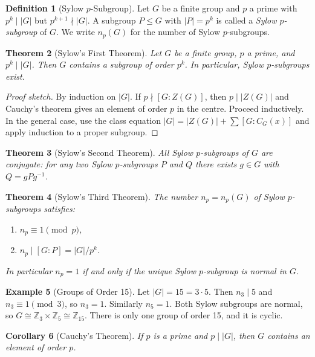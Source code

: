 \documentclass[12pt,a4paper]{amsart}
\newtheorem{theorem}{Theorem}[section]
\newtheorem{corollary}[theorem]{Corollary}
\theoremstyle{definition}
\newtheorem{definition}[theorem]{Definition}
\newtheorem{example}[theorem]{Example}
\begin{document}
\begin{definition}[Sylow $p$-Subgroup]
Let $G$ be a finite group and $p$ a prime with $p^k \mid |G|$ but $p^{k+1} \nmid |G|$.
A subgroup $P \leq G$ with $|P| = p^k$ is called a \emph{Sylow $p$-subgroup} of $G$.
We write $n_p(G)$ for the number of Sylow $p$-subgroups.
\end{definition}

\begin{theorem}[Sylow's First Theorem]
\label{thm:sylow1}
Let $G$ be a finite group, $p$ a prime, and $p^k \mid |G|$. Then $G$ contains a
subgroup of order $p^k$. In particular, Sylow $p$-subgroups exist.
\end{theorem}

\begin{proof}[Proof sketch]
By induction on $|G|$. If $p \nmid [G:Z(G)]$, then $p \mid |Z(G)|$ and Cauchy's theorem
gives an element of order $p$ in the centre. Proceed inductively. In the general case,
use the class equation $|G| = |Z(G)| + \sum [G:C_G(x)]$ and apply induction to a
proper subgroup.
\end{proof}

\begin{theorem}[Sylow's Second Theorem]
\label{thm:sylow2}
All Sylow $p$-subgroups of $G$ are conjugate: for any two Sylow $p$-subgroups $P$
and $Q$ there exists $g \in G$ with $Q = gPg^{-1}$.
\end{theorem}

\begin{theorem}[Sylow's Third Theorem]
\label{thm:sylow3}
The number $n_p = n_p(G)$ of Sylow $p$-subgroups satisfies:
\begin{enumerate}[label=(\roman*)]
  \item $n_p \equiv 1 \pmod{p}$,
  \item $n_p \mid [G : P] = |G|/p^k$.
\end{enumerate}
In particular $n_p = 1$ if and only if the unique Sylow $p$-subgroup is normal in $G$.
\end{theorem}

\begin{example}[Groups of Order 15]
Let $|G| = 15 = 3 \cdot 5$. Then $n_3 \mid 5$ and $n_3 \equiv 1 \pmod{3}$, so
$n_3 = 1$. Similarly $n_5 = 1$. Both Sylow subgroups are normal, so
$G \cong \mathbb{Z}_3 \times \mathbb{Z}_5 \cong \mathbb{Z}_{15}$. There is only one
group of order 15, and it is cyclic.
\end{example}

\begin{corollary}[Cauchy's Theorem]
If $p$ is a prime and $p \mid |G|$, then $G$ contains an element of order $p$.
\end{corollary}
\end{document}
